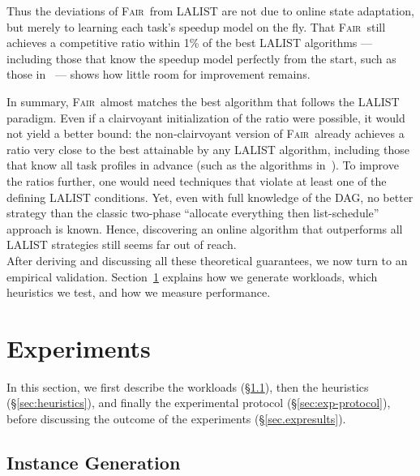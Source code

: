 \documentclass{article}
\newcommand\fair{\textsc{Fair}\xspace}
\begin{document}
Thus the deviations of \fair\ from \textsc{LALIST} are not due to online state adaptation, but merely to learning each task’s speedup model on the fly.  
That \fair\ still achieves a competitive ratio within 1\% of the best \textsc{LALIST} algorithms — including those that know the speedup model perfectly from the start, such as those in~\cite{ICPP22, TOPC24} — shows how little room for improvement remains.

In summary, \fair\ almost matches the best algorithm that follows the \textsc{LALIST} paradigm. Even if a clairvoyant initialization of the ratio were possible, it would not yield a better bound: the non‑clairvoyant version of \fair\ already achieves a ratio very close to the best attainable by any \textsc{LALIST} algorithm, including those that know all task profiles in advance (such as the algorithms in~\cite{ICPP22,TOPC24}). To improve the ratios further, one would need techniques that violate at least one of the defining \textsc{LALIST} conditions. Yet, even with full knowledge of the DAG, no better strategy than the classic two-phase “allocate everything then list-schedule” approach is known. Hence, discovering an online algorithm that outperforms all \textsc{LALIST} strategies still seems far out of reach.\\


After deriving and discussing all these theoretical guarantees, we now turn to an empirical validation. Section~\ref{sec.experiments} explains
how we generate workloads, which heuristics we test, and how we measure
performance.



\section{Experiments}
\label{sec.experiments}

In this section, we first describe the workloads (§\ref{sec:instance-gen}), then the
heuristics (§\ref{sec:heuristics}), and finally the experimental
protocol (§\ref{sec:exp-protocol}), before discussing the outcome of the experiments (§\ref{sec.expresults}).

\subsection{Instance Generation}
\label{sec:instance-gen}
\end{document}
